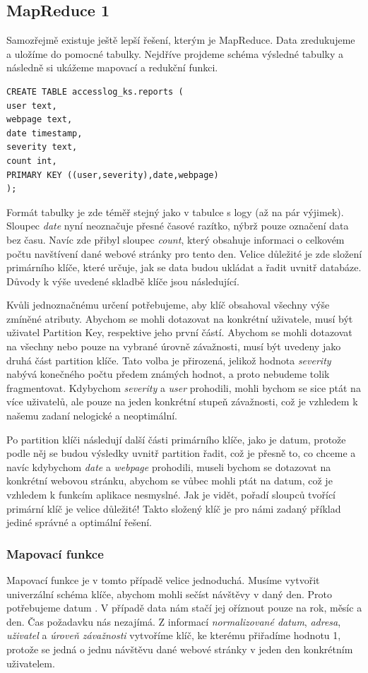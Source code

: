 \subsection{MapReduce 1}
Samozřejmě existuje ještě lepší řešení, kterým je MapReduce. Data zredukujeme a uložíme do pomocné tabulky. Nejdříve projdeme schéma výsledné tabulky a následně si ukážeme mapovací a redukční funkci.

\begin{lstlisting}[caption={Tabulka pro ukládání reportů},label=ReportTable]
CREATE TABLE accesslog_ks.reports ( 
user text,
webpage text,
date timestamp,
severity text,
count int,
PRIMARY KEY ((user,severity),date,webpage) 
);
\end{lstlisting}

Formát tabulky je zde téměř stejný jako v tabulce s logy (až na pár výjimek). Sloupec \emph{date} nyní neoznačuje přesné časové razítko, nýbrž pouze označení data bez času. Navíc zde přibyl sloupec \emph{count}, který obsahuje informaci o celkovém počtu navštívení dané webové stránky pro tento den. Velice důležité je zde složení primárního klíče, které určuje, jak se data budou ukládat a řadit uvnitř databáze. Důvody k výše uvedené skladbě klíče jsou následující. 

Kvůli jednoznačnému určení potřebujeme, aby klíč obsahoval všechny výše zmíněné atributy. Abychom se mohli dotazovat na konkrétní uživatele, musí být uživatel Partition Key, respektive jeho první částí. Abychom se mohli dotazovat na všechny nebo pouze na vybrané úrovně závažnosti, musí být uvedeny jako druhá část partition klíče. Tato volba je přirozená, jelikož hodnota \emph{severity} nabývá konečného počtu předem známých hodnot, a proto nebudeme tolik fragmentovat. Kdybychom \emph{severity} a \emph{user} prohodili, mohli bychom se sice ptát na více uživatelů, ale pouze na jeden konkrétní stupeň závažnosti, což je vzhledem k našemu zadaní nelogické a neoptimální.

Po partition klíči následují další části primárního klíče, jako je datum, protože podle něj se budou výsledky uvnitř partition řadit, což je přesně to, co chceme a navíc kdybychom \emph{date} a \emph{webpage} prohodili, museli bychom se dotazovat na konkrétní webovou stránku, abychom se vůbec mohli ptát na datum, což je vzhledem k funkcím aplikace nesmyslné. Jak je vidět, pořadí sloupců tvořící primární klíč je velice důležité! Takto složený klíč je pro námi zadaný příklad jediné správné a optimální řešení.

\subsubsection{Mapovací funkce}
Mapovací funkce je v tomto případě velice jednoduchá. Musíme vytvořit univerzální schéma klíče, abychom mohli sečíst návštěvy v daný den. Proto potřebujeme datum . V případě data nám stačí jej oříznout pouze na rok, měsíc a den. Čas požadavku nás nezajímá. Z informací \emph{normalizované datum}, \emph{adresa}, \emph{uživatel} a \emph{úroveň závažnosti} vytvoříme klíč, ke kterému přiřadíme hodnotu 1, protože se jedná o jednu návštěvu dané webové stránky v jeden den konkrétním uživatelem. 

